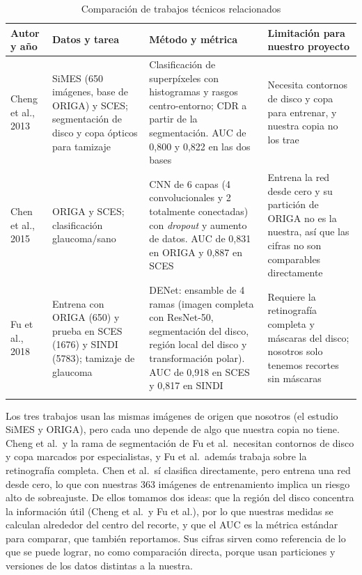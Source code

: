 \documentclass[pdflatex,sn-mathphys-num]{sn-jnl}%
\theoremstyle{thmstyleone}%
\theoremstyle{thmstyletwo}%
\theoremstyle{thmstylethree}%
\begin{document}
\begin{table}[htbp]
\caption{Comparación de trabajos técnicos relacionados}\label{tab:estado}
\begin{tabularx}{\textwidth}{@{}L{2.2cm}YYY@{}}
\toprule
Autor y año & Datos y tarea & Método y métrica & Limitación para nuestro proyecto \\
\midrule
Cheng et al., 2013 \cite{cheng2013superpixel} & SiMES (650 imágenes, base de ORIGA) y SCES; segmentación de disco y copa ópticos para tamizaje & Clasificación de superpíxeles con histogramas y rasgos centro-entorno; CDR a partir de la segmentación. AUC de 0,800 y 0,822 en las dos bases & Necesita contornos de disco y copa para entrenar, y nuestra copia no los trae \\
\addlinespace
Chen et al., 2015 \cite{chen2015glaucoma} & ORIGA y SCES; clasificación glaucoma/sano & CNN de 6 capas (4 convolucionales y 2 totalmente conectadas) con \textit{dropout} y aumento de datos. AUC de 0,831 en ORIGA y 0,887 en SCES & Entrena la red desde cero y su partición de ORIGA no es la nuestra, así que las cifras no son comparables directamente \\
\addlinespace
Fu et al., 2018 \cite{fu2018denet} & Entrena con ORIGA (650) y prueba en SCES (1676) y SINDI (5783); tamizaje de glaucoma & DENet: ensamble de 4 ramas (imagen completa con ResNet-50, segmentación del disco, región local del disco y transformación polar). AUC de 0,918 en SCES y 0,817 en SINDI & Requiere la retinografía completa y máscaras del disco; nosotros solo tenemos recortes sin máscaras \\
\botrule
\end{tabularx}
\end{table}

Los tres trabajos usan las mismas imágenes de origen que nosotros (el estudio SiMES y ORIGA), pero cada uno depende de algo que nuestra copia no tiene. Cheng et al.\ y la rama de segmentación de Fu et al.\ necesitan contornos de disco y copa marcados por especialistas, y Fu et al.\ además trabaja sobre la retinografía completa. Chen et al.\ sí clasifica directamente, pero entrena una red desde cero, lo que con nuestras 363 imágenes de entrenamiento implica un riesgo alto de sobreajuste. De ellos tomamos dos ideas: que la región del disco concentra la información útil (Cheng et al.\ y Fu et al.), por lo que nuestras medidas se calculan alrededor del centro del recorte, y que el AUC es la métrica estándar para comparar, que también reportamos. Sus cifras sirven como referencia de lo que se puede lograr, no como comparación directa, porque usan particiones y versiones de los datos distintas a la nuestra.
\end{document}
